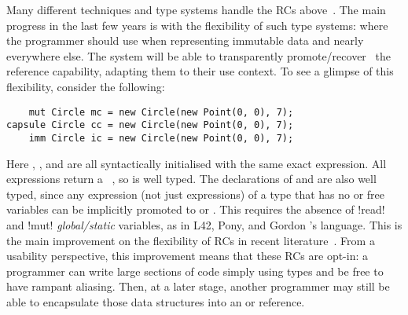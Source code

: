 
\noindent Many different techniques and type systems handle the RCs above~\cite{ZibinEtAl10,ClarkeWrigstad03,HallerOdersky10,GordonEtAl12,ServettoZucca15}.
The main progress in the last few years is with the flexibility of such type systems:
 where the programmer should use \Q@imm@ when  representing immutable data
and \Q@mut@ nearly everywhere else. The system will be able to transparently promote/recover~\cite{GordonEtAl12,clebsch2015deny,ServettoZucca15} the reference capability, adapting them to their use context.
To see a glimpse of this flexibility, consider the following:
\begin{lstlisting}
    mut Circle mc = new Circle(new Point(0, 0), 7);
capsule Circle cc = new Circle(new Point(0, 0), 7);
    imm Circle ic = new Circle(new Point(0, 0), 7);
\end{lstlisting}
Here \Q@mc@, \Q@cc@, and \Q@ic@ are all syntactically initialised with the same exact expression. All
\Q@new@ expressions return a \Q@mut@~\cite{clebsch2015deny,GIANNINI2019145}, so \Q@mc@ is well typed. The declarations of \Q@cc@ and \Q@ic@ are also well typed, since 
any expression (not just \Q@new@ expressions) 
of a \Q@mut@ type that has no \Q@mut@ or \Q@read@ free 
variables can be implicitly promoted to \Q@capsule@ or \Q@imm@.
This requires the absence of \Q!read! and \Q!mut! \emph{global/static} variables, as in L42, Pony, and Gordon \etal's language.
This is the main improvement on the flexibility of RCs in recent literature~\cite{ServettoEtAl13a,ServettoZucca15,GordonEtAl12,clebsch2015deny,clebsch2017orca}.
From a usability perspective, this improvement means that
these RCs are opt-in: a programmer can write large sections of code
simply using \Q@mut@ types and be free to have rampant aliasing. 
Then, at a later stage, another programmer may still 
be able to encapsulate those data structures into an \Q@imm@ or \Q@capsule@ reference.

